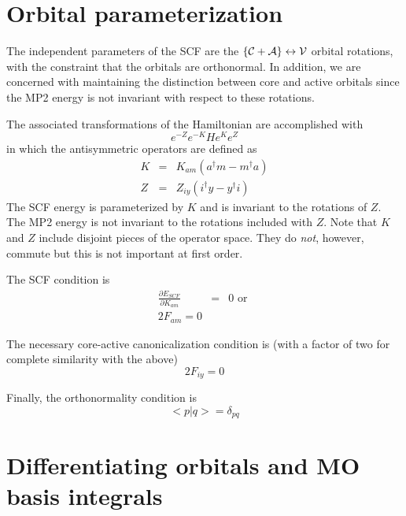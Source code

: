 \documentclass[fleqn,12pt]{article}
\newcommand{\bra}{<\!}
\newcommand{\ket}{\!>}
\newcommand{\Core}{{\cal C}}
\newcommand{\Active}{{\cal A}}
\newcommand{\Virtual}{{\cal V}}
\begin{document}
\section{Orbital parameterization}

The independent parameters of the SCF are the $\{ \Core + \Active \}
\leftrightarrow \Virtual$ orbital rotations, with the constraint that
the orbitals are orthonormal.  In addition, we are concerned with
maintaining the distinction between core and active orbitals since the
MP2 energy is not invariant with respect to these rotations.

The associated transformations of the Hamiltonian are accomplished
with 
\begin{equation}
  e^{-Z} e^{-K} H e^K e^Z
\end{equation}
in which the antisymmetric operators are defined as
\begin{eqnarray}
  K & = & K_{am} ( a^{\dagger}m - m^{\dagger}a ) \\
  Z & = & Z_{iy} ( i^{\dagger}y - y^{\dagger}i )
\end{eqnarray}
The SCF energy is parameterized by $K$ and is invariant to the
rotations of $Z$.  The MP2 energy is not invariant to the rotations
included with $Z$.  Note that $K$ and $Z$ include disjoint pieces of
the operator space.  They do {\em not}, however, commute but this is
not important at first order. 

The SCF condition is
\begin{eqnarray}
\label{eqn:brillouin}
  \frac{\partial E_{SCF}}{\partial K_{am}} & = & 0 \mbox{ or }\\
  2F_{am} = 0
\end{eqnarray}

The necessary core-active canonicalization condition is (with a factor
of two for complete similarity with the above)
\begin{equation}
\label{eqn:canon}
  2 F_{iy} = 0
\end{equation}

Finally, the orthonormality condition is
\begin{equation}
\label{eqn:ortho}
  \bra p | q \ket = \delta_{pq}
\end{equation}

\section{Differentiating orbitals and MO basis integrals}
\label{sec:orbdiff}
\end{document}

